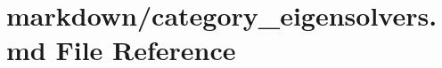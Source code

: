 \hypertarget{category__eigensolvers_8md}{}\section{markdown/category\+\_\+eigensolvers.md File Reference}
\label{category__eigensolvers_8md}

